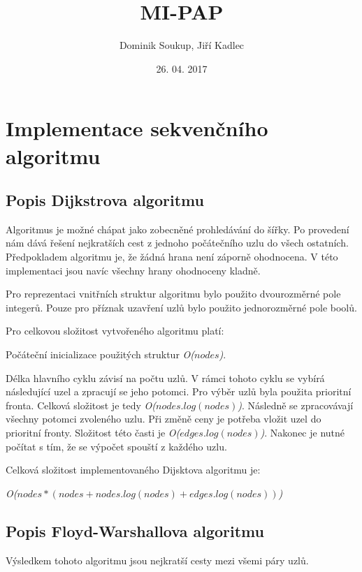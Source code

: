 \documentclass[a4paper,11pt]{article}
\title{\textbf{MI-PAP}}
\author{Dominik Soukup, Jiří Kadlec}
\date{26. 04. 2017}
\begin{document}
\maketitle
\thispagestyle{empty}
\newpage
\tableofcontents
\thispagestyle{empty}
\newpage


\section{Implementace sekvenčního algoritmu}

\subsection{Popis Dijkstrova algoritmu}
Algoritmus je možné chápat jako zobecněné prohledávání do šířky. Po provedení nám dává řešení nejkratších
cest z jednoho počátečního uzlu do všech ostatních. Předpokladem algoritmu je, že žádná hrana není záporně
ohodnocena. V této implementaci jsou navíc všechny hrany ohodnoceny kladně.

Pro reprezentaci vnitřních struktur algoritmu bylo použito dvourozměrné pole integerů. Pouze pro příznak
uzavření uzlů bylo použito jednorozměrné pole boolů. 

Pro celkovou složitost vytvořeného algoritmu platí:

Počáteční inicializace použitých struktur \textit{O(${nodes}$)}.

Délka hlavního cyklu závisí na počtu uzlů.
V rámci tohoto cyklu se vybírá následující uzel a zpracují se jeho potomci. Pro výběr uzlů byla použita
prioritní fronta. Celková složitost je tedy  \textit{O(${nodes . log(nodes)}$)}.
Následně se zpracovávají všechny potomci zvoleného uzlu. Při změně ceny je potřeba vložit uzel do prioritní
fronty. Složitost této časti je \textit{O(${edges . log(nodes)}$)}. Nakonec je nutné počítat s tím, 
že se výpočet spouští z každého uzlu. 

Celková složitost implementovaného Dijsktova algoritmu je:\-

\textit{O(${nodes*(nodes+nodes . log(nodes)+edges . log(nodes))}$)}

\subsection{Popis Floyd-Warshallova algoritmu}
Výsledkem tohoto algoritmu jsou nejkratší cesty mezi všemi páry uzlů.
\end{document}
